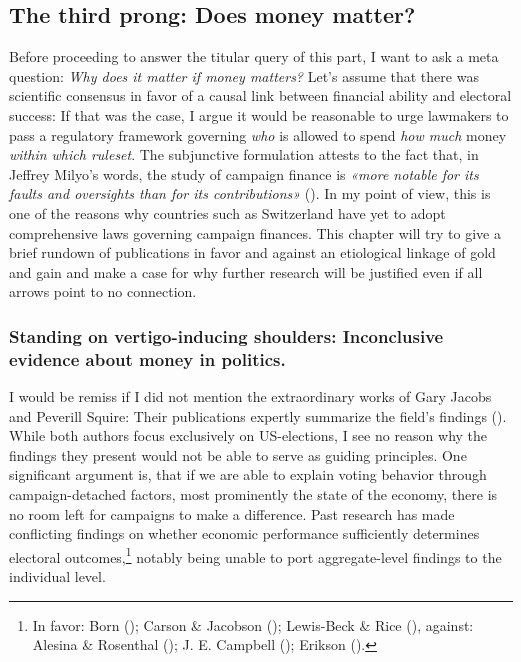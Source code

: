 \documentclass[11pt,a4paper]{article}
\begin{document}
\subsection{The third prong: Does money matter?}
Before proceeding to answer the titular query of this part, I want to ask a meta question: \textit{Why does it matter if money matters?} Let’s assume that there was scientific consensus in favor of a causal link between financial ability and electoral success: If that was the case, I argue it would be reasonable to urge lawmakers to pass a regulatory framework governing \textit{who} is allowed to spend \textit{how much} money \textit{within which ruleset}. The subjunctive formulation attests to the fact that, in Jeffrey Milyo’s words, the study of campaign finance is \textit{«more notable for its faults and oversights than for its contributions»} (\cite{milyo_political_1999}). In my point of view, this is one of the reasons why countries such as Switzerland have yet to adopt comprehensive laws governing campaign finances. This chapter will try to give a brief rundown of publications in favor and against an etiological linkage of gold and gain and make a case for why further research will be justified even if all arrows point to no connection.

\subsubsection{Standing on vertigo-inducing shoulders: Inconclusive evidence about money in politics.}
I would be remiss if I did not mention the extraordinary works of Gary Jacobs and Peverill Squire: Their publications expertly summarize the field’s findings (\cite{jacobson_money_1985,squire_candidates_1995}). While both authors focus exclusively on US-elections, I see no reason why the findings they present would not be able to serve as guiding principles. One significant argument is, that if we are able to explain voting behavior through campaign-detached factors, most prominently the state of the economy, there is no room left for campaigns to make a difference. Past research has made conflicting findings on whether economic performance sufficiently determines electoral outcomes,\footnote{In favor: Born (\citeyear{born_strategic_1986}); Carson \& Jacobson (\citeyear{carson_politics_2024}); Lewis-Beck \& Rice (\citeyear{lewis-beck_forecasting_1992}), against: Alesina \& Rosenthal (\citeyear{alesina_partisan_1989}); J. E. Campbell (\citeyear{campbell_presidential_1997}); Erikson (\citeyear{erikson_economic_1990}).} notably being unable to port aggregate-level findings to the individual level.
\end{document}
